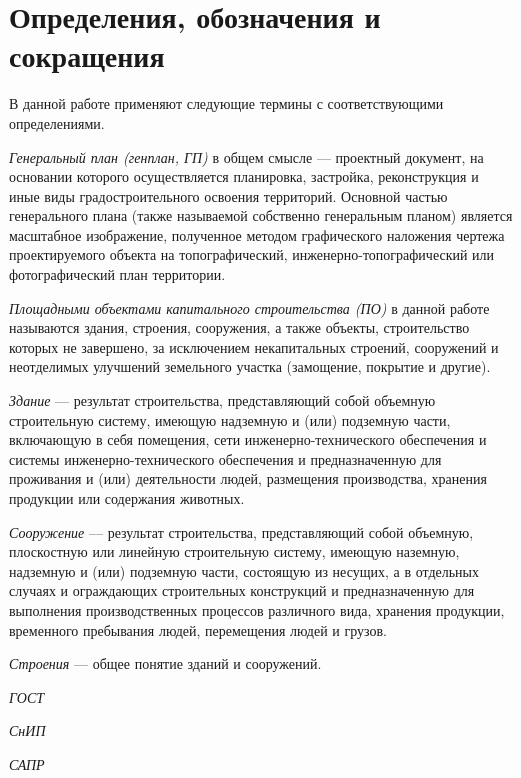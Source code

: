 \section*{\Large{Определения, обозначения и сокращения}}

В данной работе применяют следующие термины с соответствующими определениями.

\textit{Генеральный план (генплан, ГП)} в общем смысле —
проектный документ, на основании которого осуществляется планировка,
застройка, реконструкция и иные виды градостроительного освоения территорий.
Основной частью генерального плана (также называемой собственно генеральным планом)
является масштабное изображение, полученное методом графического наложения чертежа
проектируемого объекта на топографический,
инженерно-топографический или фотографический план территории.


\textit{Площадными объектами капитального строительства (ПО)} в данной работе называются
здания, строения, сооружения, а также объекты, строительство которых не завершено, за исключением некапитальных строений,
сооружений и неотделимых улучшений земельного участка (замощение, покрытие и другие)\cite{CapitalBuilding}.


\textit{Здание} — результат строительства, представляющий собой объемную строительную систему,
имеющую надземную и (или) подземную части, включающую в себя помещения,
сети инженерно-технического обеспечения и системы инженерно-технического обеспечения и предназначенную для проживания и
(или) деятельности людей, размещения производства, хранения продукции или содержания животных\cite{SafetyBuildings}.


\textit{Сооружение} — результат строительства,
представляющий собой объемную, плоскостную или линейную строительную систему,
имеющую наземную, надземную и (или) подземную части, состоящую из несущих,
а в отдельных случаях и ограждающих строительных конструкций и предназначенную для выполнения
производственных процессов различного вида, хранения продукции, временного пребывания людей,
перемещения людей и грузов\cite{SafetyBuildings}.


\textit{Строения} — общее понятие зданий и сооружений\cite{CivilCode}.


\textit{ГОСТ}

\textit{СнИП}

\textit{САПР}


